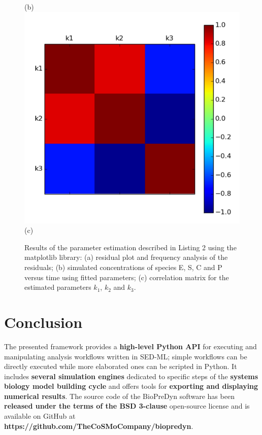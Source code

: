 \documentclass[17pt,portrait,a1,usenames,dvipsnames,plainboxedsections]{sciposter}
\begin{document}
\begin{multicols}{2}
\begin{figure}
\begin{center}
\begin{minipage}[c]{0.41\textwidth}
(b)\\
\includegraphics[width=\textwidth]{correlation_matrix.pdf}\\
(c)\\
\end{minipage}
\caption{Results of the parameter estimation described in Listing 2 using
the matplotlib library: (a) residual plot and frequency analysis of the
residuals; (b) simulated concentrations of species E, S, C and P versus time
using fitted parameters; (c) correlation matrix for the estimated parameters
$k_{1}$, $k_{2}$ and $k_{3}$.}
\end{center}
\end{figure}

\section{Conclusion}
The presented framework provides a {\bf high-level Python API} for executing
and manipulating analysis workflows written in SED-ML; simple workflows can be
directly executed while more elaborated ones can be scripted in Python. It
includes {\bf several simulation engines} dedicated to specific steps of the
{\bf systems biology model building cycle} and offers tools for {\bf exporting
and displaying numerical results}. The source code of the BioPreDyn software has
been {\bf released under the terms of the BSD 3-clause} open-source license and
is available on GitHub at {\bf https://github.com/TheCoSMoCompany/biopredyn}.
{}

\end{multicols}
\end{document}
